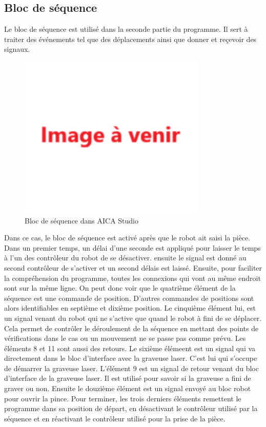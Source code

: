 \subsection{Bloc de séquence}

Le bloc de séquence est utilisé dans la seconde partie du programme. Il sert à traiter des événements tel que des déplacements ainsi que donner et reçevoir des signaux.

\begin{figure}[H]
    \centering
    \includegraphics[width=0.8\textwidth]{assets/figures/img_a_venir.png}
    \caption{Bloc de séquence dans AICA Studio}
    \label{fig:sequence_block}
\end{figure}

Dans ce cas, le bloc de séquence est activé après que le robot ait saisi la pièce. Dans un premier temps, un délai d'une seconde est appliqué pour laisser le temps à l'un des contrôleur du robot de se désactiver. ensuite le signal est donné au second contrôleur de s'activer et un second délais est laissé. Ensuite, pour faciliter la compréhension du programme, toutes les connexions qui vont au même endroit sont sur la même ligne. On peut donc voir que le quatrième élément de la séquence est une commande de position. D'autres commandes de positions sont alors identifiables en septième et dixième position. Le cinquième élément lui, est un signal venant du robot qui ne s'active que quand le robot à fini de se déplacer. Cela permet de contrôler le déroulement de la séquence en mettant des points de vérifications dans le cas ou un mouvement ne se passe pas comme prévu. Les éléments 8 et 11 sont aussi des retours. Le sixième élémeent est un signal qui va directement dans le bloc d'interface avec la graveuse laser. C'est lui qui s'occupe de démarrer la graveuse laser. L'élément 9 est un signal de retour venant du bloc d'interface de la graveuse laser. Il est utilisé pour savoir si la graveuse a fini de graver ou non. Ensuite le douzième élément est un signal envoyé au bloc robot pour ouvrir la pince. Pour terminer, les trois derniers éléments remettent le programme dans sa position de départ, en désactivant le contrôleur utilisé par la séquence et en réactivant le contrôleur utilisé pour la prise de la pièce.

